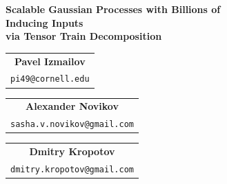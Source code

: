 \documentclass[a0,portrait]{a0poster}
\begin{document}
\begin{minipage}[b]{.75\linewidth}
  \begin{center}
  \veryHuge \color{NavyBlue} 
    \textbf{Scalable Gaussian Processes with Billions of\\ Inducing Inputs \\via Tensor Train Decomposition} \color{Black}\\ %
    {
      \huge 
      \renewcommand{\arraystretch}{0.5}
      \begin{tabular}{c}
        \textbf{Pavel Izmailov}\\
        {\Large \texttt{pi49@cornell.edu}}
      \end{tabular}\quad 
      \begin{tabular}{c}
        \textbf{Alexander Novikov}\\
        {\Large \texttt{sasha.v.novikov@gmail.com}}
      \end{tabular}
      \quad 
      \begin{tabular}{c}
        \textbf{Dmitry Kropotov}\\
        {\Large \texttt{dmitry.kropotov@gmail.com}}
      \end{tabular}
    }
\end{center}
\end{minipage}
\end{document}
